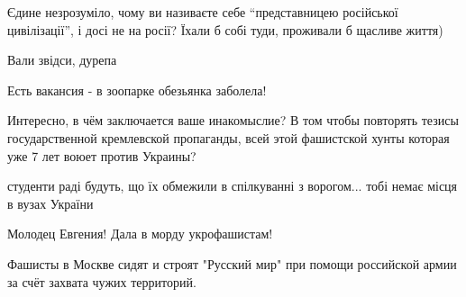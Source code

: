 \begin{itemize}
Єдине незрозуміло, чому ви називаєте себе \enquote{представницею російської цивілізації}, і досі не на росії? Їхали б собі туди, проживали б щасливе життя)

 
Вали звідси, дурепа

 
Есть вакансия - в зоопарке обезьянка заболела!

 
Интересно, в чём заключается ваше инакомыслие? В том чтобы повторять тезисы государственной кремлевской пропаганды, всей этой фашистской хунты которая уже 7 лет воюет против Украины?

 
студенти раді будуть, що їх обмежили в спілкуванні з ворогом... тобі немає місця в вузах України

 
Молодец Евгения! Дала в морду укрофашистам!

\begin{itemize}
 
Фашисты в Москве сидят и строят "Русский мир" при помощи российской армии за счёт захвата чужих территорий.


\end{itemize}
\end{itemize}
